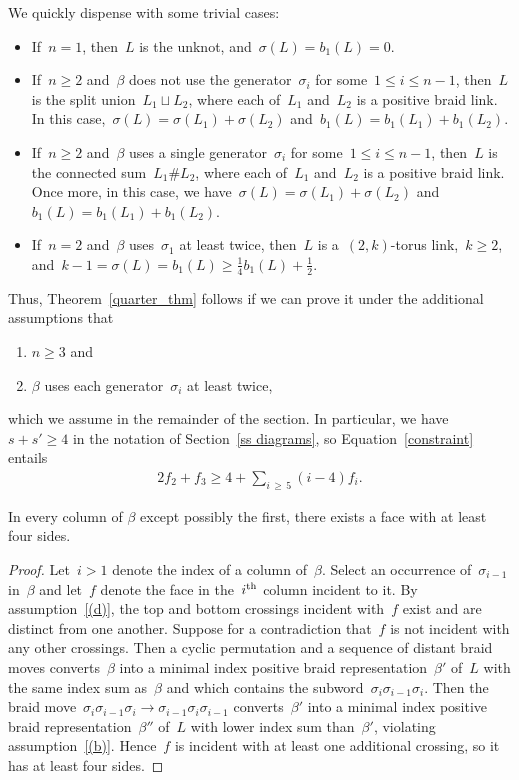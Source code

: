 \documentclass[AHL,Unicode,longabstracts,published]{cedram}
\newcommand*{\alphenumi}{\renewcommand*{\theenumi}{\alph{enumi}}}
\begin{document}
We quickly dispense with some trivial cases:
\begin{itemize}
\item If~$n=1$, then~$L$ is the unknot, and~$\sigma(L) = b_1(L) = 0$.
\item If~$n \ge 2$ and~$\beta$ does not use the generator~$\sigma_i$ for some~$1 \le i \le n-1$, then~$L$ is the split union~$L_1 \sqcup L_2$, where each of~$L_1$ and~$L_2$ is a positive braid link. In this case,~$\sigma(L) = \sigma(L_1) + \sigma(L_2)$ and~$b_1(L) = b_1(L_1) + b_1(L_2)$.
\item If~$n \ge 2$ and~$\beta$ uses a single generator~$\sigma_i$ for some~$1 \le i \le n-1$, then~$L$ is the connected sum~$L_1 \# L_2$, where each of~$L_1$ and~$L_2$ is a positive braid link. Once more, in this case, we have~$\sigma(L) = \sigma(L_1) + \sigma(L_2)$ and~$b_1(L) = b_1(L_1) + b_1(L_2)$.
\item If~$n=2$ and~$\beta$ uses~$\sigma_1$ at least twice, then~$L$ is a~$(2,k)$-torus link,~$k \ge 2$, and~$k-1 = \sigma(L) = b_1(L) \ge \frac14 b_1(L) + \frac12$.
\end{itemize}
Thus, Theorem~\ref{quarter_thm} follows if we can prove it under the additional assumptions that
\begin{enumerate}\alphenumi
\setcounter{enumi}{2}
\item\label{(c)} $n \ge 3$ and
\item\label{(d)} $\beta$ uses each generator~$\sigma_i$ at least twice,
\end{enumerate}
which we assume in the remainder of the section. In particular, we have~$s+s' \ge 4$ in the notation of Section~\ref{ss diagrams}, so Equation~\eqref{constraint} entails
\begin{align}\label{constraint2}
2f_2 + f_3 \ge 4 + \sum_{i\,\ge\,5}(i-4)f_i.
\end{align}

\begin{lemm}\label{face_lemma}
In every column of $\beta$ except possibly the first, there exists a face with at least four sides.
\end{lemm}

\begin{proof}
Let~$i > 1$ denote the index of a column of~$\beta$. Select an occurrence of~$\sigma_{i-1}$ in~$\beta$ and let~$f$ denote the face in the~$i^{\rm th}$ column incident to it. By assumption~\eqref{(d)}, the top and bottom crossings incident with~$f$ exist and are distinct from one another. Suppose for a contradiction that~$f$ is not incident with any other crossings. Then a cyclic permutation and a sequence of distant braid moves converts~$\beta$ into a minimal index positive braid representation~$\beta'$ of~$L$ with the same index sum as~$\beta$ and which contains the subword~$\sigma_{i}\sigma_{i-1}\sigma_{i}$. Then the braid move~$\sigma_{i}\sigma_{i-1}\sigma_{i}\to\sigma_{i-1}\sigma_{i}\sigma_{i-1}$ converts~$\beta'$ into a minimal index positive braid representation~$\beta''$ of~$L$ with lower index sum than~$\beta'$, violating assumption~\eqref{(b)}. Hence~$f$ is incident with at least one additional crossing, so it has at least four sides.
\end{proof}
\end{document}
